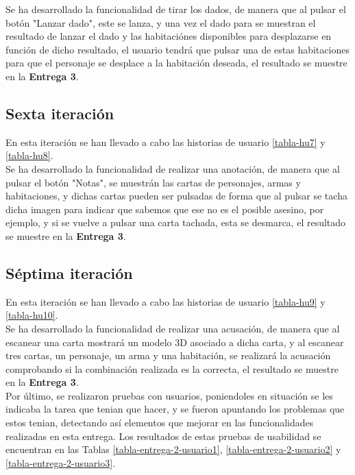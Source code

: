 \begin{itemize}
Se ha desarrollado la funcionalidad de tirar los dados, de manera que al pulsar el botón "Lanzar dado", este se lanza, y una vez el dado para se muestran el resultado de lanzar el dado y las habitaciónes disponibles para desplazarse en función de dicho resultado, el usuario tendrá que pulsar una de estas habitaciones para que el personaje se desplace a la habitación deseada, el resultado se muestre en la \textbf{Entrega 3}.\\

\subsection{Sexta iteración}
En esta iteración se han llevado a cabo las historias de usuario \ref{tabla-hu7} y \ref{tabla-hu8}.\\

Se ha desarrollado la funcionalidad de realizar una anotación, de manera que al pulsar el botón "Notas", se muestrán las cartas de personajes, armas y habitaciones, y dichas cartas pueden ser pulsadas de forma que al pulsar se tacha dicha imagen para indicar que sabemos que ese no es el posible asesino, por ejemplo, y si se vuelve a pulsar una carta tachada, esta se desmarca, el resultado se muestre en la \textbf{Entrega 3}.\\

\subsection{Séptima iteración}
En esta iteración se han llevado a cabo las historias de usuario \ref{tabla-hu9} y \ref{tabla-hu10}.\\

Se ha desarrollado la funcionalidad de realizar una acusación, de manera que al escanear una carta mostrará un modelo 3D asociado a dicha carta, y al escanear tres cartas, un personaje, un arma y una habitación, se realizará la acusación comprobando si la combinación realizada es la correcta, el resultado se muestre en la \textbf{Entrega 3}.\\

Por último, se realizaron pruebas con usuarios, poniendoles en situación se les indicaba la tarea que tenian que hacer, y se fueron apuntando los problemas que estos tenian, detectando así elementos que mejorar en las funcionalidades realizadas en esta entrega. Los resultados de estas pruebas de usabilidad se encuentran en las Tablas \ref{tabla-entrega-2-usuario1}, \ref{tabla-entrega-2-usuario2} y \ref{tabla-entrega-2-usuario3}.



\end{itemize}
